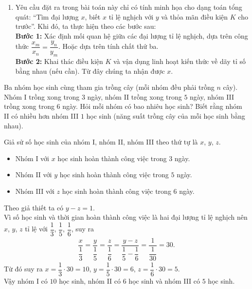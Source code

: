 \begin{vd}
{\begin{note}
\begin{enumerate}
\begin{eqnarray*}
				\end{eqnarray*}
				Vậy độ dài quãng đường $AB$ là $60 \cdot 6 = 360 \mathrm{\,km}$.
				\item Yêu cầu đặt ra trong bài toán này chỉ có tính minh họa cho dạng toán tổng quát: ``Tìm đại lượng $x$, biết $x$ tỉ lệ nghịch với $y$ và thỏa mãn điều kiện $K$ cho trước''. Khi đó, ta thực hiện theo các bước sau:	\\
				{\bf Bước 1:} Xác định mối quan hệ giữa các đại lượng tỉ lệ nghịch, dựa trên công thức $\dfrac{x_m}{x_n} = \dfrac{y_n}{y_m}$. Hoặc dựa trên tính chất thứ ba.\\
				{\bf Bước 2:} Khai thác điều kiện $K$ và vận dụng linh hoạt kiến thức về dãy tỉ số bằng nhau (nếu cần). Từ đây chúng ta nhận được $x$.
			\end{enumerate}
		\end{note}
	}
\end{vd}

\begin{vd}
	Ba nhóm học sinh cùng tham gia trồng cây (mỗi nhóm đều phải trồng $n$ cây). Nhóm I trồng xong trong $3$ ngày, nhóm II trồng xong trong $5$ ngày, nhóm III trồng xong trong $6$ ngày. Hỏi mỗi nhóm có bao nhiêu học sinh? Biết rằng nhóm II có nhiều hơn nhóm III $1$ học sinh (năng suất trồng cây của mỗi học sinh bằng nhau).
	\loigiai
	{
		Giả sử số học sinh của nhóm I, nhóm II, nhóm III theo thứ tự là $x$, $y$, $z$.
		\begin{itemize}
			\item Nhóm I với $x$ học sinh hoàn thành công việc trong $3$ ngày.
			\item Nhóm II với $y$ học sinh hoàn thành công việc trong $5$ ngày.
			\item Nhóm III với $z$ học sinh hoàn thành công việc trong $6$ ngày.
		\end{itemize}
		Theo giả thiết ta có $y-z=1$.\\
		Vì số học sinh và thời gian hoàn thành công việc là hai đại lượng tỉ lệ nghịch nên $x$, $y$, $z$ tỉ lệ với $\dfrac{1}{3}$, $\dfrac{1}{5}$, $\dfrac{1}{6}$, suy ra
		\begin{eqnarray*}
			\dfrac{x}{\dfrac{1}{3}} = \dfrac{y}{\dfrac{1}{5}} = \dfrac{z}{\dfrac{1}{6}} = \dfrac{y-z}{\dfrac{1}{5} - \dfrac{1}{6}} = \dfrac{1}{\dfrac{1}{30}} = 30.
		\end{eqnarray*}
		Từ đó suy ra $x=\dfrac{1}{3} \cdot 30 = 10$, $y=\dfrac{1}{5} \cdot 30 = 6$, $z=\dfrac{1}{6} \cdot 30 = 5$.\\
		Vậy nhóm I có $10$ học sinh, nhóm II có $6$ học sinh và nhóm III có $5$ học sinh.
	}
\end{vd}

